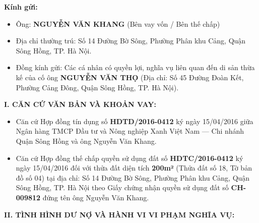 \documentclass[12pt,a4paper]{article}
\begin{document}
\textbf{Kính gửi:}

\begin{itemize}[leftmargin=*, itemsep=2pt, topsep=2pt, parsep=0pt]
  \item Ông: \textbf{NGUYỄN VĂN KHANG} (Bên vay vốn / Bên thế chấp)
  \item Địa chỉ thường trú: Số 14 Đường Bờ Sông, Phường Phân khu Cảng, Quận Sông Hồng, TP. Hà Nội.
  \item Đồng kính gửi: Các cá nhân có quyền lợi, nghĩa vụ liên quan đến di sản thừa kế của cố ông \textbf{NGUYỄN VĂN THỌ} (Địa chỉ: Số 45 Đường Đoàn Kết, Phường Cảng Đông, Quận Sông Hồng, TP. Hà Nội).


\end{itemize}

\vspace{0.3cm}\noindent\textbf{\large I. CĂN CỨ VĂN BẢN VÀ KHOẢN VAY:}\\[0.15cm]

\begin{itemize}[leftmargin=*, itemsep=2pt, topsep=2pt, parsep=0pt]
  \item Căn cứ Hợp đồng tín dụng số \textbf{HDTD/2016-0412} ký ngày 15/04/2016 giữa Ngân hàng TMCP Đầu tư và Nông nghiệp Xanh Việt Nam — Chi nhánh Quận Sông Hồng và ông Nguyễn Văn Khang.
  \item Căn cứ Hợp đồng thế chấp quyền sử dụng đất số \textbf{HDTC/2016-0412} ký ngày 15/04/2016 đối với thửa đất diện tích \textbf{200m²} (Thửa đất số 18, Tờ bản đồ số 04) tại địa chỉ: Số 14 Đường Bờ Sông, Phường Phân khu Cảng, Quận Sông Hồng, TP. Hà Nội theo Giấy chứng nhận quyền sử dụng đất số \textbf{CH-009812} đứng tên ông Nguyễn Văn Khang.


\end{itemize}

\vspace{0.3cm}\noindent\textbf{\large II. TÌNH HÌNH DƯ NỢ VÀ HÀNH VI VI PHẠM NGHĨA VỤ:}\\[0.15cm]
\end{document}
